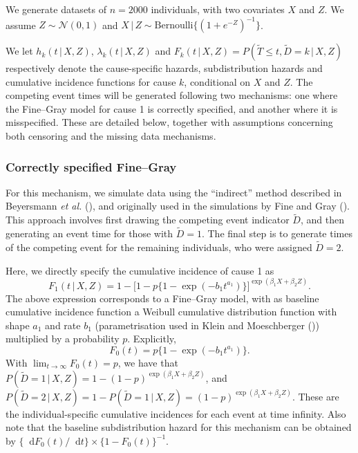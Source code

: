 \documentclass[
  letterpaper,
  DIV=11,
  numbers=noendperiod]{scrreprt}
\newcommand{\given}{\,|\,}
\newcommand\diff{\mathop{}\!\mathrm{d}}
\begin{document}
We generate datasets of \(n = 2000\) individuals, with two covariates
\(X\) and \(Z\). We assume \(Z \sim \mathcal{N}(0,1)\) and
\(X \given Z \sim \text{Bernoulli}\{(1 + e^{-Z})^{-1}\}\).

We let \(h_k(t \given X, Z)\), \(\lambda_k(t \given X, Z)\) and
\(F_k(t \given X, Z) = P(\tilde{T} \leq t, \tilde{D} = k \given X, Z)\)
respectively denote the cause-specific hazards, subdistribution hazards
and cumulative incidence functions for cause \(k\), conditional on \(X\)
and \(Z\). The competing event times will be generated following two
mechanisms: one where the Fine--Gray model for cause 1 is correctly
specified, and another where it is misspecified. These are detailed
below, together with assumptions concerning both censoring and the
missing data mechanisms.

\subsubsection{Correctly specified Fine--Gray}\label{sec-corr-spec-FG}

For this mechanism, we simulate data using the ``indirect'' method
described in Beyersmann \emph{et al.}
(), and
originally used in the simulations by Fine and Gray
(). This approach
involves first drawing the competing event indicator \(\tilde{D}\), and
then generating an event time for those with \(\tilde{D} = 1\). The
final step is to generate times of the competing event for the remaining
individuals, who were assigned \(\tilde{D} = 2\).

Here, we directly specify the cumulative incidence of cause 1 as
\begin{equation*}
    F_1(t \given X, Z) = 1 - \big[1 - p\{1- \exp(-b_1t^{a_1})\}\big]^{\exp(\beta_{1}X + \beta_{2}Z)}.
\end{equation*} The above expression corresponds to a Fine--Gray model,
with as baseline cumulative incidence function a Weibull cumulative
distribution function with shape \(a_1\) and rate \(b_1\)
(parametrisation used in Klein and Moeschberger
()) multiplied
by a probability \(p\). Explicitly, \begin{equation*}
    F_0(t) = p\{1- \exp(-b_1t^{a_1})\}.
\end{equation*} With \(\lim_{t \to \infty}F_0(t) = p\), we have that
\(P(\tilde{D} = 1 \given X,Z) = 1 - (1-p)^{\exp(\beta_{1}X + \beta_{2}Z)}\),
and
\(P(\tilde{D} = 2 \given X, Z) = 1 - P(\tilde{D} = 1 \given X, Z) = (1-p)^{\exp(\beta_{1}X + \beta_{2}Z)}\).
These are the individual-specific cumulative incidences for each event
at time infinity. Also note that the baseline subdistribution hazard for
this mechanism can be obtained by
\(\{\diff F_0(t) / \diff t\} \times \{1 - F_0(t)\}^{-1}\).
\end{document}
